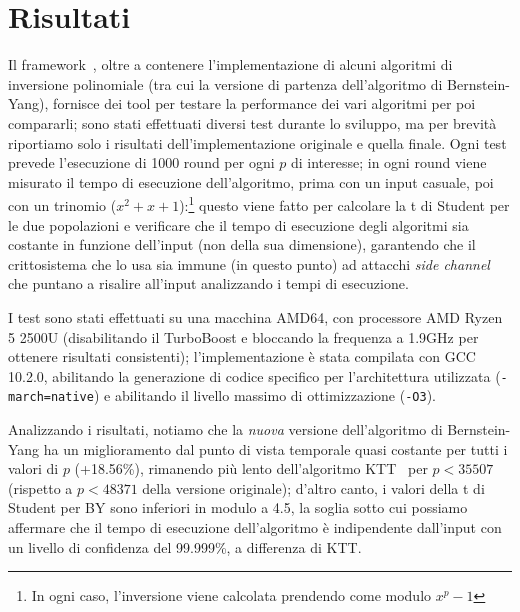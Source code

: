 \section{Risultati}\label{risultati}
Il framework~\cite{benchmark}, oltre a contenere l'implementazione di alcuni algoritmi di inversione polinomiale
(tra cui la versione di partenza dell'algoritmo di Bernstein-Yang), fornisce dei tool per testare la performance dei
vari algoritmi per poi compararli; sono stati effettuati diversi test durante lo sviluppo, ma per brevità riportiamo solo
i risultati dell'implementazione originale e quella finale.
Ogni test prevede l'esecuzione di 1000 round per ogni $p$ di interesse; in ogni round viene misurato il tempo di esecuzione
dell'algoritmo, prima con un input casuale, poi con un trinomio ($x^2+x+1$):\footnote{In ogni caso, l'inversione
viene calcolata prendendo come modulo $x^{p}-1$} questo viene fatto per calcolare la t
di Student per le due popolazioni e verificare
che il tempo di esecuzione degli algoritmi sia costante in funzione dell'input (non della sua dimensione), garantendo che
il crittosistema che lo usa sia immune (in questo punto) ad attacchi \textit{side channel} che puntano a risalire all'input
analizzando i tempi di esecuzione.

I test sono stati effettuati su una macchina AMD64, con processore AMD Ryzen 5 2500U (disabilitando il TurboBoost e
bloccando la frequenza a 1.9GHz per ottenere risultati consistenti); l'implementazione è stata compilata con GCC 10.2.0, 
abilitando la generazione di codice specifico per l'architettura utilizzata (\texttt{-march=native}) e abilitando il livello
massimo di ottimizzazione (\texttt{-O3}).






Analizzando i risultati, notiamo che la \textit{nuova} versione dell'algoritmo di Bernstein-Yang ha un miglioramento
dal punto di vista temporale quasi costante per tutti i valori di $p$ (+18.56\%), rimanendo più lento dell'algoritmo
KTT~\cite{takagi2001fast} per $p < 35507$ (rispetto a $p < 48371$ della versione originale); d'altro canto, i valori della t di Student per BY sono inferiori in modulo a 4.5, la 
soglia sotto cui possiamo affermare che il tempo di esecuzione dell'algoritmo è indipendente dall'input con un
livello di confidenza del 99.999\%, a differenza di KTT. 


